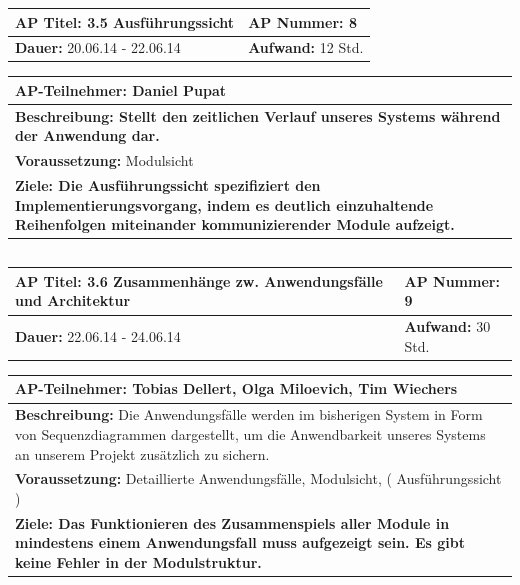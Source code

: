\documentclass[fontsize=12pt,paper=a4,twoside]{scrartcl}
\begin{document}
\begin{tabular}{|p{7.43cm}|p{7.43cm}|}
\hline
\textbf{AP Titel: }3.5 Ausführungssicht & \textbf{AP Nummer: }8\\ 
\hline
\textbf{Dauer: }20.06.14 - 22.06.14& \textbf{Aufwand: }12 Std.\\
\hline
\end{tabular}
\begin{tabular}{|p{15.3cm}|}
\hline
\textbf{AP-Teilnehmer: }Daniel Pupat \\
\hline
\textbf{Beschreibung: Stellt den zeitlichen Verlauf unseres Systems während der Anwendung dar.}\\
\hline
\textbf{Voraussetzung: }Modulsicht\\
\hline 
\textbf{Ziele: Die Ausführungssicht spezifiziert den Implementierungsvorgang, indem es deutlich einzuhaltende Reihenfolgen miteinander kommunizierender Module aufzeigt.}\\
\hline 
\end{tabular}
\begin{verbatim}

\end{verbatim}

\begin{tabular}{|p{7.43cm}|p{7.43cm}|}
\hline
\textbf{AP Titel: }3.6 Zusammenhänge zw. Anwendungsfälle und Architektur & \textbf{AP Nummer: }9\\ 
\hline
\textbf{Dauer: }22.06.14 - 24.06.14& \textbf{Aufwand: }30 Std.\\
\hline
\end{tabular}
\begin{tabular}{|p{15.3cm}|}
\hline
\textbf{AP-Teilnehmer: }Tobias Dellert, Olga Miloevich, Tim Wiechers\\
\hline
\textbf{Beschreibung: } Die Anwendungsfälle werden im bisherigen System in Form von Sequenzdiagrammen dargestellt, um die Anwendbarkeit unseres Systems an unserem Projekt
zusätzlich zu sichern.\\
\hline
\textbf{Voraussetzung: }Detaillierte Anwendungsfälle, Modulsicht, ( Ausführungssicht )\\
\hline 
\textbf{Ziele: Das Funktionieren des Zusammenspiels aller Module in mindestens einem Anwendungsfall muss aufgezeigt sein. Es gibt keine Fehler in der Modulstruktur.}\\
\hline 
\end{tabular}
\begin{verbatim}

\end{verbatim}
\end{document}
